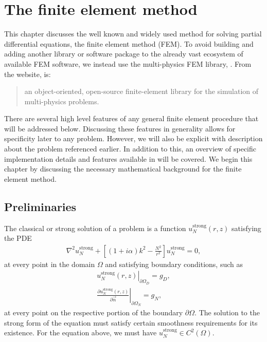 \chapter{The finite element method}
\label{sec:fem}

This chapter discusses the well known and widely used method for solving partial differential equations, the finite element method (FEM).
To avoid building and adding another library or software package to the already vast ecosystem of available FEM software, we instead use the multi-physics FEM library, \oomph.
From the website, \oomph is:
\begin{quote}
	an object-oriented, open-source finite-element library for the simulation of multi-physics problems. \cite{oomph}
\end{quote}
There are several high level features of any general finite element procedure that will be addressed below.
Discussing these features in generality allows for specificity later to any problem.
However, we will also be explicit with description about the problem referenced earlier.
In addition to this, an overview of specific implementation details and features available in \oomph will be covered.
We begin this chapter by discussing the necessary mathematical background for the finite element method.





\section{Preliminaries}

\iffalse

.Problem
.Classical vs weak solution
Test functions
Sobolev space (where test functions live)
Basis/shape functions
Galerkin method -> test functions are basis functions

\fi

The classical or strong solution of a problem is a function $u_N^{\mathrm{strong}}(r,z)$ satisfying the PDE
\begin{align}
	\nabla^2 u_N^{\mathrm{strong}} + \left[ (1+i\alpha)k^2-\frac{N^2}{r^2}\right]u_N^{\mathrm{strong}} = 0,
\end{align}
at every point in the domain $\Omega$ and satisfying boundary conditions, such as
\begin{align}
	\left. u_N^{\mathrm{strong}}(r,z) \right\vert_{\partial \Omega_D} = g_D, \\
	\left. \frac{\partial u_N^{\mathrm{strong}}(r,z)}{\partial \vec{n}} \right\vert_{\partial \Omega_N} = g_N,
\end{align}
at every point on the respective portion of the boundary $\partial\Omega$.
The solution to the strong form of the equation must satisfy certain smoothness requirements for its existence.
For the equation above, we must have $u_N^{\mathrm{strong}} \in C^2(\Omega)$.

